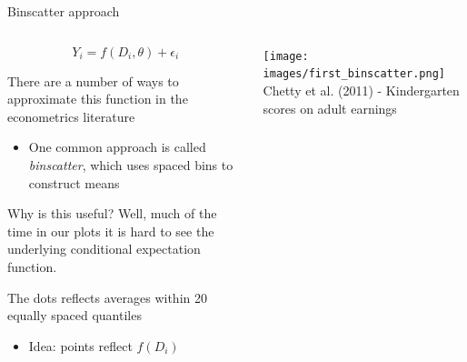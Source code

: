\documentclass[notes,11pt, aspectratio=169]{beamer}
\newenvironment{wideitemize}{\itemize\addtolength{\itemsep}{10pt}}{\enditemize}
\begin{document}
\begin{frame}{Binscatter approach}
  \begin{columns}[T] %
    \begin{column}{.5\textwidth}
      $$ Y_{i} = f(D_{i},\theta) + \epsilon_{i}$$
      \vspace{-10pt}
  \begin{wideitemize}
  \item There are a number of ways to approximate this function in the econometrics literature
    \begin{itemize}
    \item One common approach is called \emph{binscatter}, which uses
      spaced bins to construct means
    \end{itemize}
  \item Why is this useful? Well, much of the time in our plots it is
    hard to see the underlying conditional expectation function.
  \item The dots reflects averages within 20 equally spaced quantiles
    \begin{itemize}
    \item Idea: points reflect $f(D_{i})$
    \end{itemize}
  \end{wideitemize}
  \end{column}%
  \hfill%
  \begin{column}{.5\textwidth}
\texttt{[image: images/first\_binscatter.png]}
Chetty et al. (2011) - Kindergarten scores on adult earnings
  \end{column}
\end{columns}
\end{frame}
\end{document}
